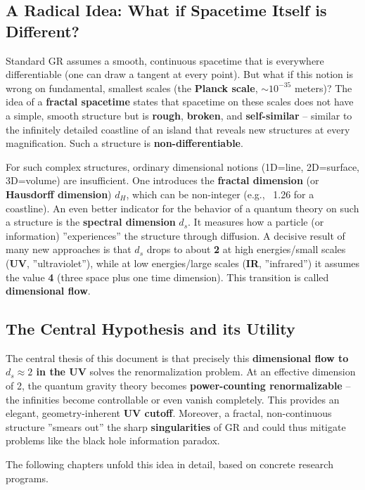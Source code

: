 	\subsection{A Radical Idea: What if Spacetime Itself is Different?}
	Standard GR assumes a smooth, continuous spacetime that is everywhere differentiable (one can draw a tangent at every point). But what if this notion is wrong on fundamental, smallest scales (the \textbf{Planck scale}, $\sim 10^{-35}$ meters)? The idea of a \textbf{fractal spacetime} states that spacetime on these scales does not have a simple, smooth structure but is \textbf{rough}, \textbf{broken}, and \textbf{self-similar} – similar to the infinitely detailed coastline of an island that reveals new structures at every magnification. Such a structure is \textbf{non-differentiable}.
	
	For such complex structures, ordinary dimensional notions (1D=line, 2D=surface, 3D=volume) are insufficient. One introduces the \textbf{fractal dimension} (or \textbf{Hausdorff dimension}) $d_H$, which can be non-integer (e.g., ~1.26 for a coastline). An even better indicator for the behavior of a quantum theory on such a structure is the \textbf{spectral dimension} $d_s$. It measures how a particle (or information) ''experiences'' the structure through diffusion. A decisive result of many new approaches is that $d_s$ drops to about \textbf{2} at high energies/small scales (\textbf{UV}, ''ultraviolet''), while at low energies/large scales (\textbf{IR}, ''infrared'') it assumes the value \textbf{4} (three space plus one time dimension). This transition is called \textbf{dimensional flow}.
	
	\subsection{The Central Hypothesis and its Utility}
	The central thesis of this document is that precisely this \textbf{dimensional flow to $d_s \approx 2$ in the UV} solves the renormalization problem. At an effective dimension of 2, the quantum gravity theory becomes \textbf{power-counting renormalizable} – the infinities become controllable or even vanish completely. This provides an elegant, geometry-inherent \textbf{UV cutoff}. Moreover, a fractal, non-continuous structure ''smears out'' the sharp \textbf{singularities} of GR and could thus mitigate problems like the black hole information paradox.
	
	The following chapters unfold this idea in detail, based on concrete research programs.
	
